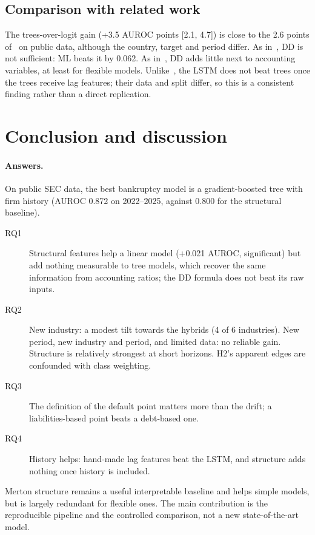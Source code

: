 \subsection{Comparison with related work}

The trees-over-logit gain (+3.5 AUROC points [2.1, 4.7]) is close to the 2.6 points of~\cite{moscatelli2020}
on public data, although the country, target and period differ. As in~\cite{bharath2008}, DD is not
sufficient: ML beats it by 0.062. As in~\cite{campbell2008}, DD adds little next to accounting variables,
at least for flexible models. Unlike~\cite{pellegrino2024}, the LSTM does not beat trees once the trees
receive lag features; their data and split differ, so this is a consistent finding rather than a direct
replication.

\section{Conclusion and discussion}
\label{sec:conclusion}

\paragraph{Answers.} On public SEC data, the best bankruptcy model is a gradient-boosted tree with firm history
(AUROC 0.872 on 2022--2025, against 0.800 for the structural baseline).
\begin{description}
  \item[RQ1] Structural features help a linear model (+0.021 AUROC, significant) but add nothing measurable to
             tree models, which recover the same information from accounting ratios; the DD formula does not
             beat its raw inputs.
  \item[RQ2] New industry: a modest tilt towards the hybrids (4 of 6 industries). New period, new industry and period,
             and limited data: no reliable gain. Structure is relatively strongest at short horizons. H2's apparent
             edges are confounded with class weighting.
  \item[RQ3] The definition of the default point matters more than the drift; a liabilities-based point beats a debt-based one.
  \item[RQ4] History helps: hand-made lag features beat the LSTM, and structure adds nothing once history is included.
\end{description}
Merton structure remains a useful interpretable baseline and helps simple models, but is largely redundant for
flexible ones. The main contribution is the reproducible pipeline and the controlled comparison, not a new
state-of-the-art model.

